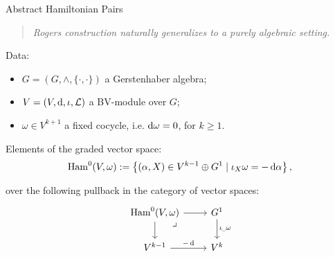 \documentclass[beamer,10pt]{standalone}
\begin{document}
\checkpoint

\begin{frame}[fragile]{Abstract Hamiltonian Pairs}
  \begin{quote}
    \emph{Rogers construction naturally generalizes to a purely algebraic setting.}
  \end{quote}
  \vfill\pause

  Data:
  \begin{itemize}
    \item $G = (G,\wedge,\lbrace \cdot, \cdot \rbrace)$ a Gerstenhaber algebra;
    \item $V = (V,\mathop{}\!\mathrm{d},\iota,\mathcal{L})$ a BV-module over $G$;
    \item $\omega \in V^{k{+}1}$ a fixed cocycle, i.e. $\mathop{}\!\mathrm{d} \omega = 0$, for $k\geq 1$.
  \end{itemize}
  \vfill\pause

  \begin{defblock}
    Elements of the graded vector space:
	  $$
		\mathrm{Ham}^0(V, \omega) := \left\{ (\alpha, X) \in V^{k-1} \oplus G^1 \mid \iota_X \omega = -\mathop{}\!\mathrm{d}\alpha \right\},
    $$
  \end{defblock}
  \vfill\pause

  \begin{remblock}
     over the following pullback in the category of vector spaces:
	\begin{displaymath}
		\begin{tikzcd}
			\Ham^0(V, \omega) \arrow[r] \arrow[d] \ar[dr,"\lrcorner",very near start,phantom]& G^1 \ar[d,"\iota_{\blank}\omega"] \\
			V^{k-1} \arrow[r, "-\d"] & V^{k}
		\end{tikzcd}
	\end{displaymath}
  \end{remblock}
\end{frame}
\end{document}
